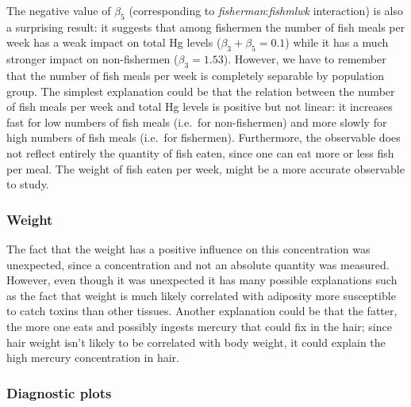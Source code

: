 \documentclass[12pt,]{article}
\begin{document}
The negative value of \(\beta_5\) (corresponding to
\emph{fisherman}:\emph{fishmlwk} interaction) is also a surprising
result: it suggests that among fishermen the number of fish meals per
week has a weak impact on total Hg levels (\(\beta_3+\beta_5 = 0.1\))
while it has a much stronger impact on non-fishermen
(\(\beta_3 = 1.53\)). However, we have to remember that the number of
fish meals per week is completely separable by population group. The
simplest explanation could be that the relation between the number of
fish meals per week and total Hg levels is positive but not linear: it
increases fast for low numbers of fish meals (i.e.~for non-fishermen)
and more slowly for high numbers of fish meals (i.e.~for fishermen).
Furthermore, the observable does not reflect entirely the quantity of
fish eaten, since one can eat more or less fish per meal. The weight of
fish eaten per week, might be a more accurate observable to study.

\subsubsection{Weight}\label{weight}

The fact that the weight has a positive influence on this concentration
was unexpected, since a concentration and not an absolute quantity was
measured. However, even though it was unexpected it has many possible
explanations such as the fact that weight is much likely correlated with
adiposity more susceptible to catch toxins than other tissues. Another
explanation could be that the fatter, the more one eats and possibly
ingests mercury that could fix in the hair; since hair weight isn't
likely to be correlated with body weight, it could explain the high
mercury concentration in hair.

\subsubsection{Diagnostic plots}\label{diagnostic-plots}
\end{document}
